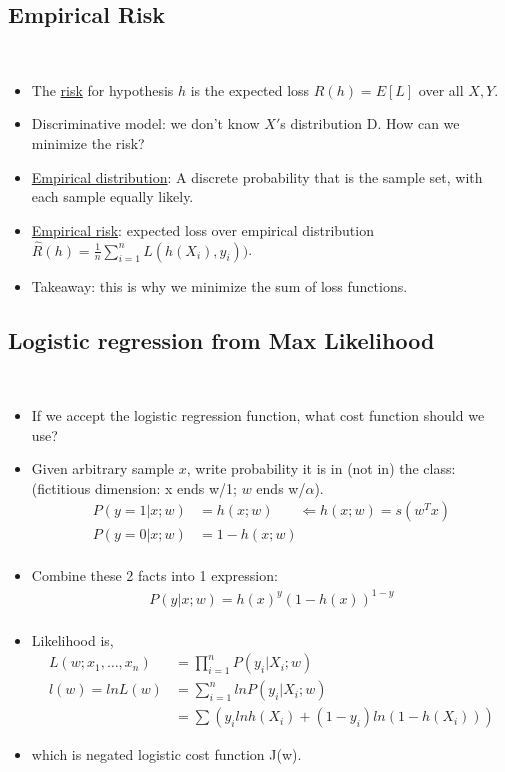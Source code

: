 \documentclass[10pt]{article}
\begin{document}
	\subsection*{Empirical Risk}
	\
	\begin{itemize}
		\item The \underline{risk} for hypothesis $h$ is the expected loss $R(h) = E[L]$ over all $X, Y$.
		\item Discriminative model: we don't know $X'$s distribution D. How can we minimize the risk?
		\item \underline{Empirical distribution}: A discrete probability that is the sample set, with each sample equally likely.
		\item \underline{Empirical risk}: expected loss over empirical distribution $\hat{R}(h) = \frac{1}{n} \sum_{i=1}^{n} L(h(X_{i}), y_{i}))$.
		\item Takeaway: this is why we minimize the sum of loss functions.
	\end{itemize}
	
	\subsection*{Logistic regression from Max Likelihood}
	\
	\begin{itemize}
		\item If we accept the logistic regression function, what cost function should we use?
		\item Given arbitrary sample $x$, write probability it is in (not in) the class: (fictitious dimension: x ends w/1; $w$ ends w/$\alpha$).
			\begin{align*}
				P(y=1|x;w) &= h(x;w) \ \ \ \ \ \ \ \ \Leftarrow h(x;w) = s(w^{T}x)\\
				P(y=0|x;w) &= 1 - h(x;w)\\
			\end{align*}
		\item Combine these 2 facts into 1 expression:
			\begin{align*}
				P(y|x;w) = h(x)^{y}(1 - h(x))^{1-y}\\
			\end{align*}
		
		\item Likelihood is,
			\begin{align*}
				L(w; x_{1}, \dots, x_{n}) &= \prod_{i=1}^{n} P(y_{i}|X_{i};w)\\
				l(w) = ln L(w) &= \sum_{i=1}^{n} ln P(y_{i}|X_{i};w)\\
				&= \sum (y_{i}ln h(X_{i}) + (1-y_{i})ln(1-h(X_{i})))
			\end{align*}
		\item which is negated logistic cost function J(w).
	\end{itemize}
	
\end{document}

